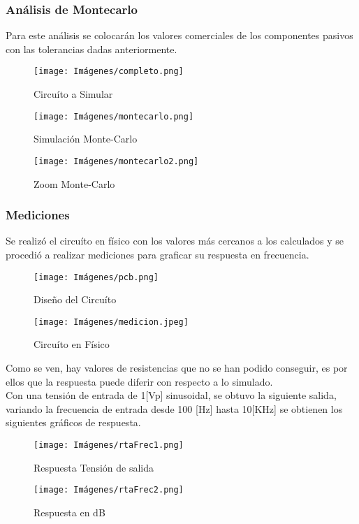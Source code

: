     \newpage
    \subsubsection{Análisis de Montecarlo}
    
    Para este análisis se colocarán los valores comerciales de los componentes pasivos con las tolerancias dadas anteriormente.\\

    \begin{figure}[!ht]
        \centering
        \texttt{[image: Imágenes/completo.png]}
        \caption{Circuíto a Simular}
    \end{figure}

    \begin{figure}[!ht]
        \centering
        \texttt{[image: Imágenes/montecarlo.png]}
        \caption{Simulación Monte-Carlo}
    \end{figure}

    \begin{figure}[!ht]
        \centering
        \texttt{[image: Imágenes/montecarlo2.png]}
        \caption{Zoom Monte-Carlo}
    \end{figure}

    \clearpage
    \subsubsection{Mediciones}
    Se realizó el circuíto en físico con los valores más cercanos a los calculados y se procedió a realizar mediciones para graficar su respuesta en frecuencia.\\

    \begin{figure}[!ht]
        \centering
        \texttt{[image: Imágenes/pcb.png]}
        \caption{Diseño del Circuíto}
    \end{figure}

    \begin{figure}[!ht]
        \centering
        \texttt{[image: Imágenes/medicion.jpeg]}
        \caption{Circuíto en Físico}
    \end{figure}

    Como se ven, hay valores de resistencias que no se han podido conseguir, es por ellos que la respuesta puede diferir con respecto a lo simulado.\\

    Con una tensión de entrada de 1[Vp] sinusoidal, se obtuvo la siguiente salida, variando la frecuencia de entrada desde 100 [Hz] hasta 10[KHz] se obtienen los siguientes gráficos de respuesta.\\

    \begin{figure}[!ht]
        \centering
        \texttt{[image: Imágenes/rtaFrec1.png]}
        \caption{Respuesta Tensión de salida}
    \end{figure}

    \begin{figure}[!ht]
        \centering
        \texttt{[image: Imágenes/rtaFrec2.png]}
        \caption{Respuesta en dB}
    \end{figure}